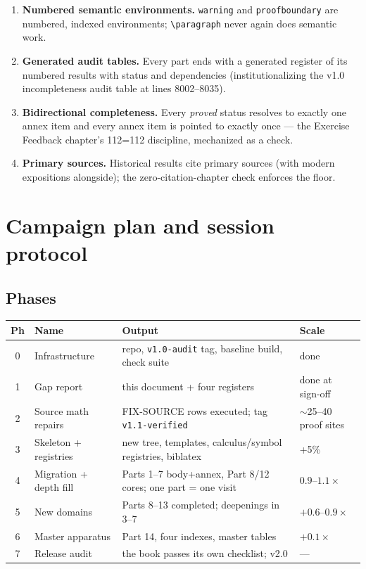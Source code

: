 \documentclass[11pt,letterpaper]{article}
\begin{document}
\begin{enumerate}[label=\textbf{Ruling \arabic*.},ref=\arabic*,leftmargin=2.2em]
        own requirement at v1.0 lines 12518--12525, mechanized).
  \item \textbf{Numbered semantic environments.}  \texttt{warning} and
        \texttt{proofboundary} are numbered, indexed environments;
        \verb|\paragraph| never again does semantic work.
  \item \textbf{Generated audit tables.}  Every part ends with a
        generated register of its numbered results with status and
        dependencies (institutionalizing the v1.0 incompleteness audit
        table at lines 8002--8035).
  \item \label{ruling:annex}\textbf{Bidirectional completeness.}  Every
        \emph{proved} status resolves to exactly one annex item and
        every annex item is pointed to exactly once --- the Exercise
        Feedback chapter's 112=112 discipline, mechanized as a check.
  \item \textbf{Primary sources.}  Historical results cite primary
        sources (with modern expositions alongside); the
        zero-citation-chapter check enforces the floor.
\end{enumerate}

\section{Campaign plan and session protocol}
\label{sec:campaign}

\subsection{Phases}
\begin{center}\small
\begin{tabular}{@{}clp{2.75in}l@{}}
\toprule
\textbf{Ph} & \textbf{Name} & \textbf{Output} & \textbf{Scale} \\
\midrule
0 & Infrastructure & repo, \texttt{v1.0-audit} tag, baseline build, check suite & done \\
1 & Gap report & this document + four registers & done at sign-off \\
2 & Source math repairs & FIX-SOURCE rows executed; tag \texttt{v1.1-verified} & $\sim$25--40 proof sites \\
3 & Skeleton + registries & new tree, templates, calculus/symbol registries, biblatex & +5\% \\
4 & Migration + depth fill & Parts 1--7 body+annex, Part 8/12 cores; one part = one visit & $0.9$--$1.1\times$ \\
5 & New domains & Parts 8--13 completed; deepenings in 3--7 & $+0.6$--$0.9\times$ \\
6 & Master apparatus & Part 14, four indexes, master tables & $+0.1\times$ \\
7 & Release audit & the book passes its own checklist; v2.0 & --- \\
\bottomrule
\end{tabular}
\end{center}
\end{document}

